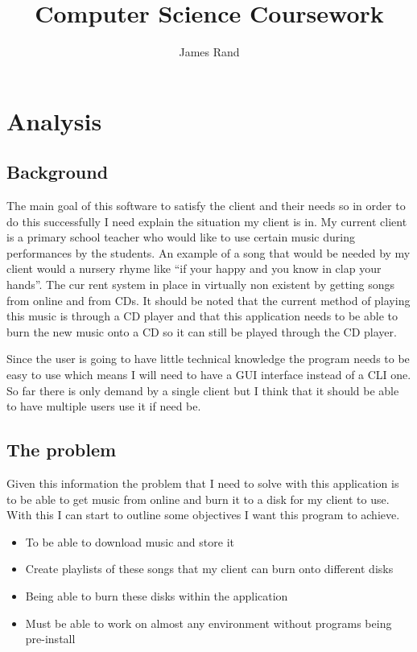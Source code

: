 \documentclass{article}
\title{Computer Science Coursework}
\date{}
\author{James Rand}
\def\tightlist{}
\begin{document}
\maketitle

\tableofcontents
\setcounter{tocdepth}{5}

\newpage

\section{Analysis}\label{analysis}

\subsection{Background}\label{background}

The main goal of this software to satisfy the client and their needs so
in order to do this successfully I need explain the situation my client
is in. My current client is a primary school teacher who would like to
use certain music during performances by the students. An example of a
song that would be needed by my client would a nursery rhyme like ``if
your happy and you know in clap your hands''. The cur	rent system in
place in virtually non existent by getting songs from online
and from CDs. It should be noted that the current method of playing this music
is through a CD player and that this application needs to be able to
burn the new music onto a CD so it can still be played through the CD
player.

Since the user is going to have little technical knowledge the program
needs to be easy to use which means I will need to have a GUI interface
instead of a CLI one. So far there is only demand by a single client but
I think that it should be able to have multiple users use it if need be.


\subsection{The problem}\label{the-problem}

Given this information the problem that I need to solve with this
application is to be able to get music from online and burn it to a disk
for my client to use. With this I can start to outline some objectives I
want this program to achieve.

\begin{itemize}
        \tightlist
    \item
        To be able to download music and store it
    \item
        Create playlists of these songs that my client can burn onto different
        disks
    \item
        Being able to burn these disks within the application
    \item
        Must be able to work on almost any environment without programs being
        pre-install 
\end{itemize}
\end{document}
